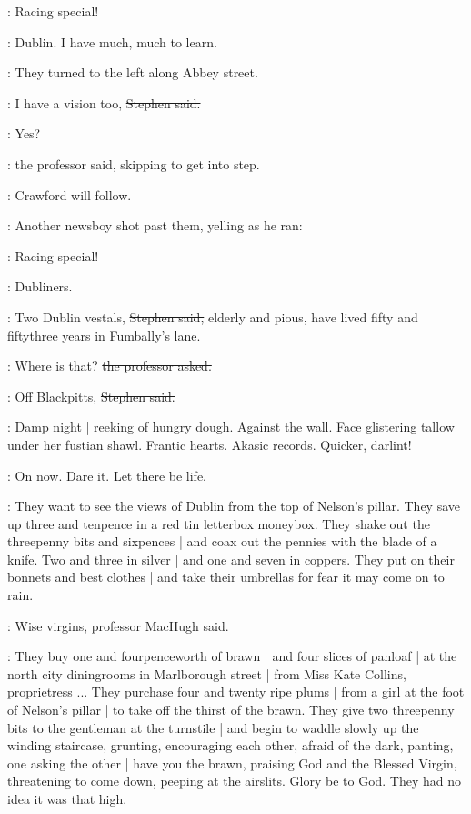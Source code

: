 \boy:
Racing special!

\StephenInt:
Dublin.
I have much, much to learn.

:
They turned to the left along Abbey street.

\Stephen:
I have a vision too,
\sout{Stephen said.}

\machugh:
Yes?

:
the professor said,
skipping to get into step.

\machugh:
Crawford will follow.

:
Another newsboy shot past them,
yelling as he ran:

\boy:
Racing special!



\StephenInt:
Dubliners.

\Stephen:
Two Dublin vestals,
\sout{Stephen said,}
elderly and pious,
have lived fifty and fiftythree years in Fumbally's lane.

\machugh:
Where is that?
\sout{the professor asked.}

\Stephen:
Off Blackpitts,
\sout{Stephen said.}

\StephenInt:
Damp night |
reeking of hungry dough.
Against the wall.
Face glistering tallow under her fustian shawl.
Frantic hearts.
Akasic records.
Quicker, darlint!

\StephenInt:
On now.
Dare it.
Let there be life.

\Stephen:
They want to see the views of Dublin from the top of Nelson's pillar.
They save up three and tenpence in a red tin letterbox moneybox.
They shake out the threepenny bits and sixpences |
and coax out the pennies with the blade of a knife.
Two and three in silver |
and one and seven in coppers.
They put on their bonnets and best clothes |
and take their umbrellas for fear it may come on to rain.

\machugh:
Wise virgins,
\sout{professor MacHugh said.}



\Stephen:
They buy one and fourpenceworth of brawn |
and four slices of panloaf |
at the north city diningrooms in Marlborough street |
from Miss Kate Collins, proprietress ...
They purchase four and twenty ripe plums |
from a girl at the foot of Nelson's pillar |
to take off the thirst of the brawn.
They give two threepenny bits to the gentleman at the turnstile |
and begin to waddle slowly up the winding staircase,
grunting,
encouraging each other,
afraid of the dark,
panting,
one asking the other |
have you the brawn,
praising
God and the Blessed Virgin,
threatening to come down,
peeping at the airslits.
Glory be to God.
They had no idea it was that high.

